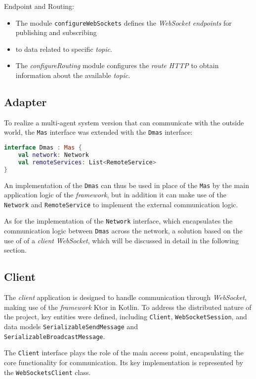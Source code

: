 {{Endpoint and Routing:

\begin{itemize}
    \item The module \texttt{configureWebSockets} defines the \textit{WebSocket endpoints} for publishing and subscribing
    \item to data related to specific \textit{topic}.
    \item The \textit{configureRouting} module configures the \textit{route HTTP} to obtain information about the available \textit{topic}.
\end{itemize}

\subsection{Adapter}
To realize a multi-agent system version that can communicate with the outside world, the \texttt{Mas} interface was extended with the \texttt{Dmas} interface:

\begin{lstlisting}[language=Kotlin]
interface Dmas : Mas {
    val network: Network
    val remoteServices: List<RemoteService>
}
\end{lstlisting}

An implementation of the \texttt{Dmas} can thus be used in place of the \texttt{Mas} by the main application logic of the \textit{framework}, but in addition it can make use of the \texttt{Network} and \texttt{RemoteService} to
implement the external communication logic.

As for the implementation of the \texttt{Network} interface, which encapsulates the communication logic between \texttt{Dmas} across the network, a solution based on the use of
of a \textit{client} \textit{WebSocket}, which will be discussed in detail in the following section.

\subsection{Client}
The \textit{client} application is designed to handle communication through \textit{WebSocket},
making use of the \textit{framework} Ktor in Kotlin. To address the distributed nature of the project,
key entities were defined, including \texttt{Client}, \texttt{WebSocketSession}, and data models
\texttt{SerializableSendMessage} and \\ \texttt{SerializableBroadcastMessage}.

The \texttt{Client} interface plays the role of the main access point, encapsulating the core functionality for
communication. Its key implementation is represented by the \texttt{WebSocketsClient} class.

}}
